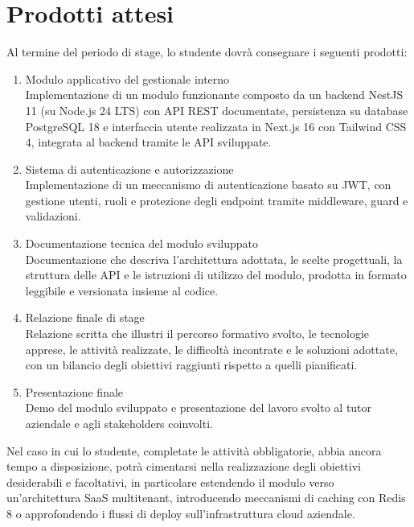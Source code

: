 \section*{Prodotti attesi}
Al termine del periodo di stage, lo studente dovrà consegnare i seguenti prodotti:
\begin{enumerate}
    \item Modulo applicativo del gestionale interno \\
    Implementazione di un modulo funzionante composto da un backend NestJS 11 (su Node.js 24 LTS) con API REST documentate, persistenza su database PostgreSQL 18 e interfaccia utente realizzata in Next.js 16 con Tailwind CSS 4, integrata al backend tramite le API sviluppate.

    \item Sistema di autenticazione e autorizzazione \\
    Implementazione di un meccanismo di autenticazione basato su JWT, con gestione utenti, ruoli e protezione degli endpoint tramite middleware, guard e validazioni.

    \item Documentazione tecnica del modulo sviluppato \\
    Documentazione che descriva l'architettura adottata, le scelte progettuali, la struttura delle API e le istruzioni di utilizzo del modulo, prodotta in formato leggibile e versionata insieme al codice.

    \item Relazione finale di stage \\
    Relazione scritta che illustri il percorso formativo svolto, le tecnologie apprese, le attività realizzate, le difficoltà incontrate e le soluzioni adottate, con un bilancio degli obiettivi raggiunti rispetto a quelli pianificati.

    \item Presentazione finale \\
    Demo del modulo sviluppato e presentazione del lavoro svolto al tutor aziendale e agli stakeholders coinvolti.
\end{enumerate}

Nel caso in cui lo studente, completate le attività obbligatorie, abbia ancora tempo a disposizione, potrà cimentarsi nella realizzazione degli obiettivi desiderabili e facoltativi, in particolare estendendo il modulo verso un'architettura SaaS multitenant, introducendo meccanismi di caching con Redis 8 o approfondendo i flussi di deploy sull'infrastruttura cloud aziendale.
